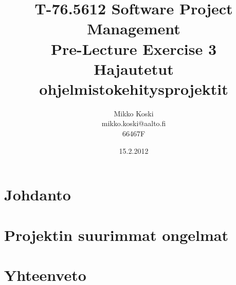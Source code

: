 \documentclass[a4paper]{article}
\begin{document}
\title{\small T-76.5612 Software Project Management \\ Pre-Lecture Exercise 3 \\ \huge Hajautetut ohjelmistokehitysprojektit}
\date{15.2.2012}
\author{Mikko Koski \\ mikko.koski@aalto.fi \\ 66467F}
\maketitle

\normalsize

\section{Johdanto}

\section{Projektin suurimmat ongelmat}


\section{Yhteenveto}
\end{document}
